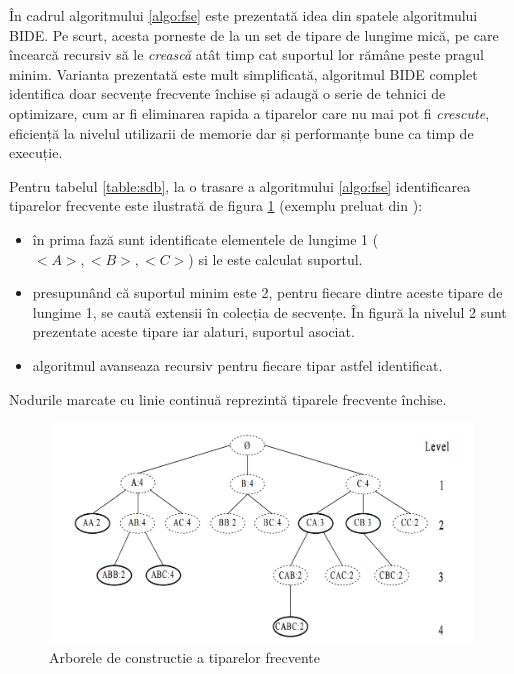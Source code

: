 În cadrul algoritmului \ref{algo:fse} este prezentată idea din spatele algoritmului BIDE. Pe scurt, acesta porneste de la un set de tipare de lungime mică, pe care încearcă recursiv să le \textit{crească} atât timp cat suportul lor rămâne peste pragul minim. Varianta prezentată este mult simplificată, algoritmul BIDE complet identifica doar secvențe frecvente închise și adaugă o serie de tehnici de optimizare, cum ar fi eliminarea rapida a tiparelor care nu mai pot fi \textit{crescute}, eficiență la nivelul utilizarii de memorie dar și performanțe bune ca timp de execuție.

\begin{ex}
Pentru tabelul \ref{table:sdb}, la o trasare a algoritmului \ref{algo:fse} identificarea tiparelor frecvente este ilustrată de figura \ref{fig:bide-algo} (exemplu preluat din \cite{bib:wang2004bide}):
\begin{itemize}
\item în prima fază sunt identificate elementele de lungime 1 ($<A>,<B>,<C>$) si le este calculat suportul.
\item presupunând că suportul minim este 2, pentru fiecare dintre aceste tipare de lungime 1, se caută extensii în colecția de secvențe. În figură la nivelul 2 sunt prezentate aceste tipare iar alaturi, suportul asociat.
\item algoritmul avanseaza recursiv pentru fiecare tipar astfel identificat.

\end{itemize}
Nodurile marcate cu linie continuă reprezintă tiparele frecvente închise. 
\end{ex}

\begin{figure}[h]
    \centering
    \includegraphics[width=\textwidth]{figures/bide-tree.png}
    \caption{Arborele de constructie a tiparelor frecvente}
    \label{fig:bide-algo}
\end{figure}

